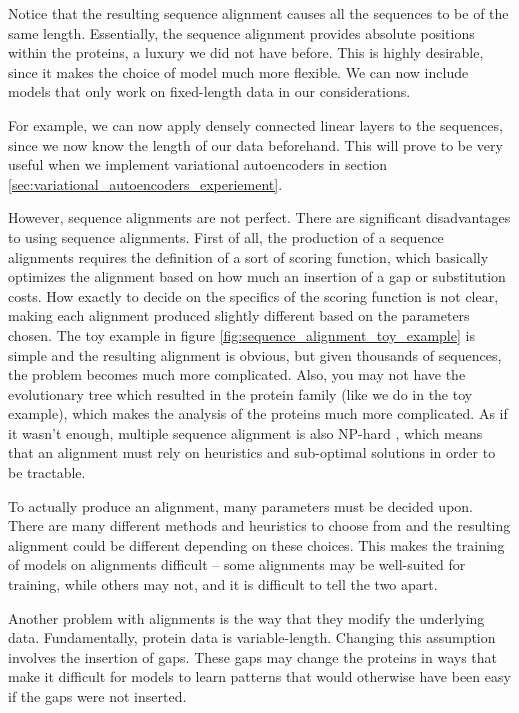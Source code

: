 Notice that the resulting sequence alignment causes all the sequences to be of the same length. Essentially, the sequence alignment provides absolute positions within the proteins, a luxury we did not have before. This is highly desirable, since it makes the choice of model much more flexible. We can now include models that only work on fixed-length data in our considerations.

For example, we can now apply densely connected linear layers to the sequences, since we now know the length of our data beforehand. This will prove to be very useful when we implement variational autoencoders in section \ref{sec:variational_autoencoders_experiement}.

However, sequence alignments are not perfect. There are significant disadvantages to using sequence alignments. First of all, the production of a sequence alignments requires the definition of a sort of scoring function, which basically optimizes the alignment based on how much an insertion of a gap or substitution costs. How exactly to decide on the specifics of the scoring function is not clear, making each alignment produced slightly different based on the parameters chosen. The toy example in figure \ref{fig:sequence_alignment_toy_example} is simple and the resulting alignment is obvious, but given thousands of sequences, the problem becomes much more complicated. Also, you may not have the evolutionary tree which resulted in the protein family (like we do in the toy example), which makes the analysis of the proteins much more complicated. As if it wasn't enough, multiple sequence alignment is also NP-hard \cite{wang1994complexity}, which means that an alignment must rely on heuristics and sub-optimal solutions in order to be tractable.

To actually produce an alignment, many parameters must be decided upon. There are many different methods and heuristics to choose from and the resulting alignment could be different depending on these choices. This makes the training of models on alignments difficult -- some alignments may be well-suited for training, while others may not, and it is difficult to tell the two apart.

Another problem with alignments is the way that they modify the underlying data. Fundamentally, protein data is variable-length. Changing this assumption involves the insertion of gaps. These gaps may change the proteins in ways that make it difficult for models to learn patterns that would otherwise have been easy if the gaps were not inserted.


